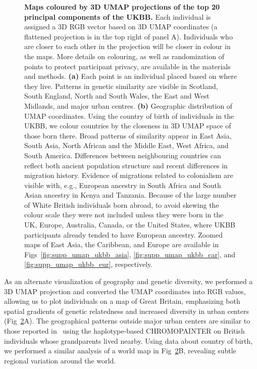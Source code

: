 \begin{figure}[h!]
\begin{subfigure}[b]{0.4\linewidth}
    \caption{}
  \label{fig:umap_world_map}
  \end{subfigure}
  \caption[Maps coloured by 3D UMAP projections]{\textbf{Maps coloured by 3D UMAP projections of the top 20 principal components of the UKBB.} Each individual is assigned a 3D RGB vector based on 3D UMAP coordinates (a flattened projection is in the top right of panel A). Individuals who are closer to each other in the projection will be closer in colour in the maps. More details on colouring, as well as randomization of points to protect participant privacy, are available in the materials and methods. \textbf{(a)} Each point is an individual placed based on where they live. Patterns in genetic similarity are visible in Scotland, South England, North and South Wales, the East and West Midlands, and major urban centres. \textbf{(b)} Geographic distribution of UMAP coordinates. Using the country of birth of individuals in the UKBB, we colour countries by the closeness in 3D UMAP space of those born there. Broad patterns of similarity appear in East Asia, South Asia, North African and the Middle East, West Africa, and South America. Differences between neighbouring countries can reflect both ancient population structure and recent differences in migration history. Evidence of migrations related to colonialism are visible with, e.g., European ancestry in South Africa and South Asian ancestry in Kenya and Tanzania. Because of the large number of White British individuals born abroad, to avoid skewing the colour scale they were not included unless they were born in the UK, Europe, Australia, Canada, or the United States, where UKBB participants already tended to have European ancestry. Zoomed maps of East Asia, the Caribbean, and Europe are available in Figs~\ref{fig:supp_umap_ukbb_asia}, \ref{fig:supp_umap_ukbb_car}, and \ref{fig:supp_umap_ukbb_eur}, respectively.}
  \label{fig:fig5}
\end{figure}

\clearpage

As an alternate visualization of geography and genetic diversity, we performed a 3D UMAP projection and converted the UMAP coordinates into RGB values, allowing us to plot individuals on a map of Great Britain, emphasizing both spatial gradients of genetic relatedness and increased diversity in urban centers (Fig~\ref{fig:fig5}A). The geographical patterns outside major urban centers are similar to those reported in~\citep{leslie2015fine} using the haplotype-based CHROMOPAINTER on British individuals whose grandparents lived nearby. Using data about country of birth, we performed a similar analysis of a world map in Fig~\ref{fig:fig5}B, revealing subtle regional variation around the world. 

